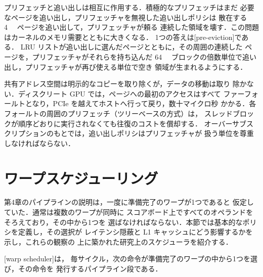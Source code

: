 \documentclass[../main.tex]{subfiles}
\begin{document}
%
プリフェッチと追い出しは相互に作用する．積極的なプリフェッチはまだ
必要なページを追い出し，プリフェッチャを無視した追い出しポリシは
散在する \SI{4}{\kibi\byte} ページを追い出して，プリフェッチャが頼る
連続した領域を壊す．この問題はカーネルのメモリ需要とともに大きくなる．
1つの答えは[pre-eviction]である．
LRU リストが追い出しに選んだページとともに，その周囲の連続した
ページを，プリフェッチャがそれらを持ち込んだ \SI{64}{\kibi\byte}
ブロックの倍数単位で追い出し，プリフェッチャが再び使える単位で空き
領域が生まれるようにする．

\begin{keypoint}
  共有アドレス空間は明示的なコピーを取り除くが，データの移動は取り
  除かない．ディスクリート GPU では，ページへの最初のアクセスはすべて
  ファーフォールトとなり，PCIe を越えてホストへ行って戻り，数十マイクロ秒
  かかる．各フォールトの周囲のプリフェッチ（ツリーベースの方式）は，
  スレッドブロックが順序どおりに実行されなくても往復のコストを償却する．
  オーバーサブスクリプションのもとでは，追い出しポリシはプリフェッチャが
  扱う単位を尊重しなければならない．
\end{keypoint}

\section{ワープスケジューリング}
\label{sec:l07-scheduling}

第4章のパイプラインの説明は，一度に準備完了のワープが1つであると
仮定していた．通常は複数のワープが同時に
スコアボード上ですべてのオペランドをそろえており，その中から1つを
選ばなければならない．本節では基本的なポリシを定義し，その選択が
レイテンシ隠蔽と L1 キャッシュにどう影響するかを示し，これらの観察の
上に築かれた研究上のスケジューラを紹介する．

\begin{definition}[ワープスケジューラ]
  \label{def:l07-warp-scheduler}
  [warp scheduler]は，
  毎サイクル，次の命令が準備完了のワープの中から1つを選び，その命令を
  発行するパイプライン段である．
\end{definition}
\end{document}
